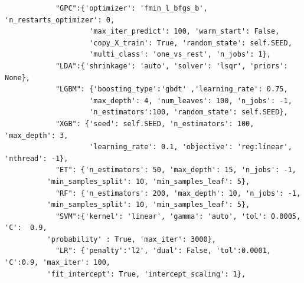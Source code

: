\documentclass[a4paper,10pt]{article}
\begin{document}
\begin{verbatim}
            "GPC":{'optimizer': 'fmin_l_bfgs_b', 'n_restarts_optimizer': 0, 
                    'max_iter_predict': 100, 'warm_start': False, 
                    'copy_X_train': True, 'random_state': self.SEED, 
                    'multi_class': 'one_vs_rest', 'n_jobs': 1},
            "LDA":{'shrinkage': 'auto', 'solver': 'lsqr', 'priors': None},
            "LGBM": {'boosting_type':'gbdt' ,'learning_rate': 0.75, 
                    'max_depth': 4, 'num_leaves': 100, 'n_jobs': -1,
                    'n_estimators':100, 'random_state': self.SEED},  
            "XGB": {'seed': self.SEED, 'n_estimators': 100, 'max_depth': 3,
                    'learning_rate': 0.1, 'objective': 'reg:linear', 'nthread': -1},
            "ET": {'n_estimators': 50, 'max_depth': 15, 'n_jobs': -1, 
		  'min_samples_split': 10, 'min_samples_leaf': 5},
            "RF": {'n_estimators': 200, 'max_depth': 10, 'n_jobs': -1, 
		  'min_samples_split': 10, 'min_samples_leaf': 5},            
            "SVM":{'kernel': 'linear', 'gamma': 'auto', 'tol': 0.0005, 'C':  0.9, 
		  'probability' : True, 'max_iter': 3000},
            "LR": {'penalty':'l2', 'dual': False, 'tol':0.0001, 'C':0.9, 'max_iter': 100, 
		  'fit_intercept': True, 'intercept_scaling': 1},
\end{verbatim}



\end{document}
